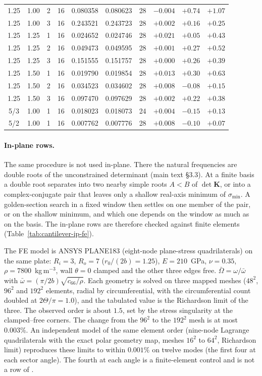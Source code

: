 \documentclass[11pt]{article}
\begin{document}
\begin{table}[!htbp]
\begin{tabular}{cccccccccc}
1.25 & 1.00 & 2 & 16 & 0.080358 & 0.080623 & 28 & $-0.004$ & $+0.74$ & $+1.07$\\
1.25 & 1.00 & 3 & 16 & 0.243521 & 0.243723 & 28 & $+0.002$ & $+0.16$ & $+0.25$\\
1.25 & 1.25 & 1 & 16 & 0.024652 & 0.024746 & 28 & $+0.021$ & $+0.05$ & $+0.43$\\
1.25 & 1.25 & 2 & 16 & 0.049473 & 0.049595 & 28 & $+0.001$ & $+0.27$ & $+0.52$\\
1.25 & 1.25 & 3 & 16 & 0.151555 & 0.151757 & 28 & $+0.000$ & $+0.26$ & $+0.39$\\
1.25 & 1.50 & 1 & 16 & 0.019790 & 0.019854 & 28 & $+0.013$ & $+0.30$ & $+0.63$\\
1.25 & 1.50 & 2 & 16 & 0.034523 & 0.034602 & 28 & $+0.008$ & $-0.08$ & $+0.15$\\
1.25 & 1.50 & 3 & 16 & 0.097470 & 0.097629 & 28 & $+0.002$ & $+0.22$ & $+0.38$\\
5/3 & 1.00 & 1 & 16 & 0.018023 & 0.018073 & 24 & $+0.004$ & $-0.15$ & $+0.13$\\
5/2 & 1.00 & 1 & 16 & 0.007762 & 0.007776 & 28 & $+0.008$ & $-0.10$ & $+0.07$\\
\bottomrule
\end{tabular}
\end{table}

\paragraph{In-plane rows.} The same procedure is not used in-plane.
There the natural frequencies are double roots of the unconstrained
determinant (main text \S3.3). At a finite basis a double root separates
into two nearby simple roots $A<B$ of $\det\mathbf K$, or into a
complex-conjugate pair that leaves only a shallow real-axis minimum of
$\sigma_{\min}$. A golden-section search in a fixed window then settles
on one member of the pair, or on the shallow minimum, and which one
depends on the window as much as on the basis. The in-plane rows are
therefore checked against finite elements (Table~\ref{tab:cantilever-ip-fe}).

The FE model is ANSYS PLANE183 (eight-node plane-stress quadrilaterals)
on the same plate: $R_i=3$, $R_o=7$ ($r_0/(2b)=1.25$), $E=210$~GPa,
$\nu=0.35$, $\rho=7800$~kg\,m$^{-3}$, wall $\theta=0$ clamped and the
other three edges free. $\bar\Omega=\omega/\bar\omega$ with
$\bar\omega=(\pi/2b)\sqrt{c_{66}/\rho}$. Each geometry is solved on
three mapped meshes ($48^2$, $96^2$ and $192^2$ elements, radial by
circumferential, with the circumferential count doubled at
$2\Theta/\pi=1.0$), and the tabulated value is the Richardson limit of
the three. The observed order is about $1.5$, set by the stress
singularity at the clamped--free corners. The change from the $96^2$ to
the $192^2$ mesh is at most $0.003\%$. An independent model of the
same element order (nine-node Lagrange quadrilaterals with the exact
polar geometry map, meshes $16^2$ to $64^2$, Richardson limit)
reproduces these limits to within $0.001\%$ on twelve modes
(the first four at each sector angle). The fourth at each angle is a
finite-element control and is not a row of \cite{seok2}.
\end{document}
